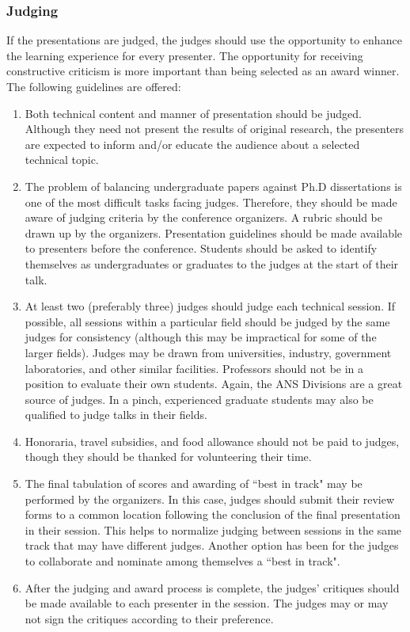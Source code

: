 \documentclass[12pt]{article}
\begin{document}
\subsubsection{Judging}
If the presentations are judged, the judges should use the opportunity to enhance the learning experience for every presenter.
The opportunity for receiving constructive criticism is more important than being selected as an award winner.
The following guidelines are offered:

\begin{enumerate}
    \item Both technical content and manner of presentation should be judged. Although they need not present the results of original research, the presenters are expected to inform and/or educate the audience about a selected technical topic.
    \item The problem of balancing undergraduate papers against Ph.D dissertations is one of the most difficult tasks facing judges. Therefore, they should be made aware of judging criteria by the conference organizers. A rubric should be drawn up by the organizers. Presentation guidelines should be made available to presenters before the conference. Students should be asked to identify themselves as undergraduates or graduates to the judges at the start of their talk.
    \item At least two (preferably three) judges should judge each technical session. If possible, all sessions within a particular field should be judged by the same judges for consistency (although this may be impractical for some of the larger fields). Judges may be drawn from universities, industry, government laboratories, and other similar facilities. Professors should not be in a position to evaluate their own students. Again, the ANS Divisions are a great source of judges. In a pinch, experienced graduate students may also be qualified to judge talks in their fields.
    \item Honoraria, travel subsidies, and food allowance should not be paid to judges, though they should be thanked for volunteering their time.
    \item The final tabulation of scores and awarding of ``best in track" may be performed by the organizers. In this case, judges should submit their review forms to a common location following the conclusion of the final presentation in their session. This helps to normalize judging between sessions in the same track that may have different judges. Another option has been for the judges to collaborate and nominate among themselves a ``best in track".
    \item After the judging and award process is complete, the judges' critiques should be made available to each presenter in the session. The judges may or may not sign the critiques according to their preference.
\end{enumerate}
\end{document}
